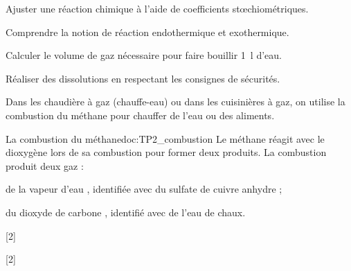 \teteSndChim


\begin{objectifs}
  \item Ajuster une réaction chimique à l'aide de coefficients stœchiométriques.
  \item Comprendre la notion de réaction endothermique et exothermique. 
  \item Calculer le volume de gaz nécessaire pour faire bouillir \qty{1}{\litre} d'eau.
  \item Réaliser des dissolutions en respectant les consignes de sécurités.
\end{objectifs}

\begin{contexte}
  Dans les chaudière à gaz (chauffe-eau) ou dans les cuisinières à gaz, on utilise la combustion du méthane pour chauffer de l'eau ou des aliments.
  
\end{contexte}


\begin{doc}{La combustion du méthane}{doc:TP2_combustion}
  Le méthane \methane réagit avec le dioxygène \dioxygene lors de sa combustion pour former deux produits.
  La combustion produit deux gaz :
  \begin{listePoints}
    \item de la vapeur d'eau , identifiée avec du sulfate de cuivre anhydre ;
    \item du dioxyde de carbone \dioxydeDeCarbone, identifié avec de l'eau de chaux.
  \end{listePoints}
\end{doc}


[2]

[2]

